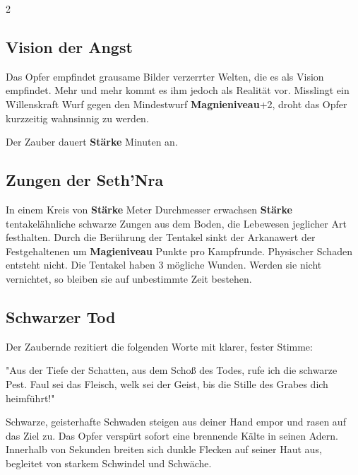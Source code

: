 \begin{multicols*}{2}


\subsection{Vision der Angst}

Das Opfer empfindet grausame Bilder verzerrter Welten, die es als Vision empfindet. Mehr und mehr kommt es ihm jedoch als Realität vor. Misslingt ein Willenskraft Wurf gegen den Mindestwurf \textbf{Magnieniveau}+2, droht das Opfer kurzzeitig wahnsinnig zu werden.

Der Zauber dauert \textbf{Stärke} Minuten an.



\subsection{Zungen der Seth'Nra}

In einem Kreis von \textbf{Stärke} Meter Durchmesser erwachsen \textbf{Stärke} tentakelähnliche schwarze Zungen aus dem Boden, die Lebewesen jeglicher Art festhalten. Durch die Berührung der Tentakel sinkt der Arkanawert der Festgehaltenen um \textbf{Magieniveau} Punkte pro Kampfrunde. Physischer Schaden entsteht nicht. Die Tentakel haben 3 mögliche Wunden. Werden sie nicht vernichtet, so bleiben sie auf unbestimmte Zeit bestehen.



\subsection{Schwarzer Tod}

Der Zaubernde rezitiert die folgenden Worte mit klarer, fester Stimme:

"Aus der Tiefe der Schatten, aus dem Schoß des Todes, rufe ich die schwarze Pest. Faul sei das Fleisch, welk sei der Geist, bis die Stille des Grabes dich heimführt!"

Schwarze, geisterhafte Schwaden steigen aus deiner Hand empor und rasen auf das Ziel zu. Das Opfer verspürt sofort eine brennende Kälte in seinen Adern. Innerhalb von Sekunden breiten sich dunkle Flecken auf seiner Haut aus, begleitet von starkem Schwindel und Schwäche.


\end{multicols*}
